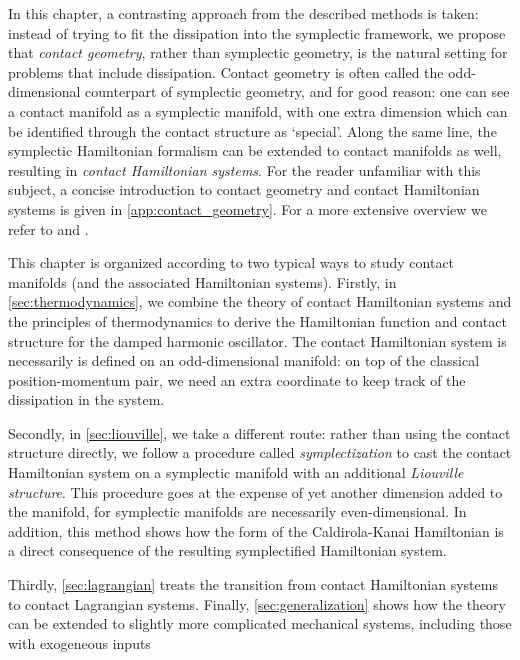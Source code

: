 In this chapter, a contrasting approach from the described methods is taken: instead of trying to fit the dissipation into the symplectic framework, we propose that \emph{contact geometry}, rather than symplectic geometry, is the natural setting for problems that include dissipation. Contact geometry is often called the odd-dimensional counterpart of symplectic geometry, and for good reason: one can see a contact manifold as a symplectic manifold, with one extra dimension which can be identified through the contact structure as `special'. Along the same line, the symplectic Hamiltonian formalism can be extended to contact manifolds as well, resulting in \emph{contact Hamiltonian systems}. For the reader unfamiliar with this subject, a concise introduction to contact geometry and contact Hamiltonian systems is given in \cref{app:contact_geometry}. For a more extensive overview we refer to \citet{Geiges2008} and \citet{Libermann1987}.

This chapter is organized according to two typical ways to study contact manifolds (and the associated Hamiltonian systems). Firstly, in \cref{sec:thermodynamics}, we combine the theory of contact Hamiltonian systems and the principles of thermodynamics to derive the Hamiltonian function and contact structure for the damped harmonic oscillator. The contact Hamiltonian system is necessarily is defined on an odd-dimensional manifold: on top of the classical position-momentum pair, we need an extra coordinate to keep track of the dissipation in the system. 

Secondly, in \cref{sec:liouville}, we take a different route: rather than using the contact structure directly, we follow a procedure called \emph{symplectization} to cast the contact Hamiltonian system on a symplectic manifold with an additional \emph{Liouville structure}. This procedure goes at the expense of yet another dimension added to the manifold, for symplectic manifolds are necessarily even-dimensional. 
In addition, this method shows how the form of the Caldirola-Kanai Hamiltonian is a direct consequence of the resulting symplectified Hamiltonian system.

Thirdly, \cref{sec:lagrangian} treats the transition from contact Hamiltonian systems to contact Lagrangian systems. Finally, \cref{sec:generalization} shows how the theory can be extended to slightly more complicated mechanical systems, including those with exogeneous inputs

